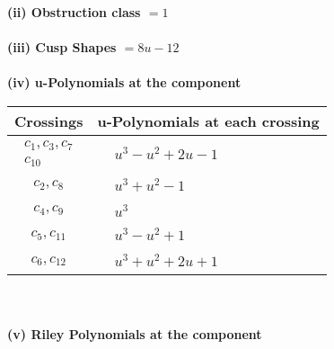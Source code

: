 \documentclass[1p]{elsarticle_modified}
\theoremstyle{definition}
\begin{document}
\flushleft \textbf{(ii) Obstruction class $= 1$}\\~\\
\flushleft \textbf{(iii) Cusp Shapes $= 8 u-12$}\\~\\
\newpage\renewcommand{\arraystretch}{1}
\flushleft \textbf{(iv) u-Polynomials at the component}\newline \\
\begin{tabular}{m{50pt}|m{274pt}}
Crossings & \hspace{64pt}u-Polynomials at each crossing \\
\hline $$\begin{aligned}c_{1},c_{3},c_{7}\\c_{10}\end{aligned}$$&$\begin{aligned}
&u^3- u^2+2 u-1
\end{aligned}$\\
\hline $$\begin{aligned}c_{2},c_{8}\end{aligned}$$&$\begin{aligned}
&u^3+u^2-1
\end{aligned}$\\
\hline $$\begin{aligned}c_{4},c_{9}\end{aligned}$$&$\begin{aligned}
&u^3
\end{aligned}$\\
\hline $$\begin{aligned}c_{5},c_{11}\end{aligned}$$&$\begin{aligned}
&u^3- u^2+1
\end{aligned}$\\
\hline $$\begin{aligned}c_{6},c_{12}\end{aligned}$$&$\begin{aligned}
&u^3+u^2+2 u+1
\end{aligned}$\\
\hline
\end{tabular}\\~\\
\newpage\renewcommand{\arraystretch}{1}
\flushleft \textbf{(v) Riley Polynomials at the component}\newline \\
\end{document}
